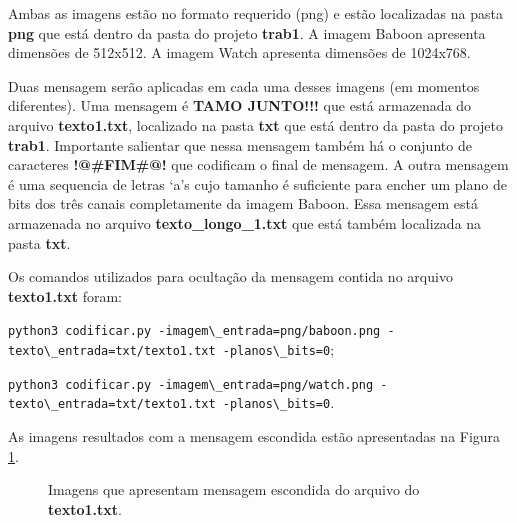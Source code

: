\documentclass{article}
\begin{document}
\noindent
Ambas as imagens estão no formato requerido (png) e estão localizadas na pasta \textbf{png} que está dentro da pasta do projeto \textbf{trab1}. A imagem Baboon apresenta dimensões de 512x512. A imagem Watch apresenta dimensões de 1024x768. 

Duas mensagem serão aplicadas em cada uma desses imagens (em momentos diferentes). Uma mensagem é \textbf{TAMO JUNTO!!!} que está armazenada do arquivo \textbf{texto1.txt}, localizado na pasta \textbf{txt} que está dentro da pasta do projeto \textbf{trab1}. Importante salientar que nessa mensagem também há o conjunto de caracteres \textbf{!@\#FIM\#@!} que codificam o final de mensagem. A outra mensagem é uma sequencia de letras `a's cujo tamanho é suficiente para encher um plano de bits dos três canais completamente da imagem Baboon. Essa mensagem está armazenada no arquivo \textbf{texto\_longo\_1.txt} que está também localizada na pasta \textbf{txt}.

Os comandos utilizados para ocultação da mensagem contida no arquivo \textbf{texto1.txt} foram:

\lstinline{python3 codificar.py -imagem\_entrada=png/baboon.png -texto\_entrada=txt/texto1.txt -planos\_bits=0};

\lstinline{python3 codificar.py -imagem\_entrada=png/watch.png -texto\_entrada=txt/texto1.txt -planos\_bits=0}.

\noindent
As imagens resultados com a mensagem escondida estão apresentadas na Figura \ref{fig:imagem:saida}.
	
\begin{figure}[htp]%
\centering
{}%
\qquad
{}%
\caption{Imagens que apresentam mensagem escondida do arquivo do \textbf{texto1.txt}.}%
\label{fig:imagem:saida}%
\end{figure}	
\end{document}
